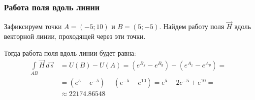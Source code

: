 \begin{frame}\frametitle{Работа поля вдоль линии}
	Зафиксируем точки \(A = (-5; 10)\) и \(B = (5; -5)\).
	Найдем работу поля $\vec H$ вдоль векторной линии,
	проходящей через эти точки.

	Тогда работа поля вдоль линии будет равна:
	\begin{align*}
		\int\limits_{AB} \vec H \, d \vec s
		 & =
		U(B) - U(A)
		=
		(e^{B_x} - e^{B_y}) - (e^{A_x} - e^{A_y}) = \\
		 & = (e^5 - e^{-5}) - (e^{-5} - e^{10}) =
		e^5 - 2 e^{-5} + e^{10} =                   \\
		 & \approx 22174.86548
		\label{eq:work_across_line}
	\end{align*}
\end{frame}
